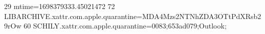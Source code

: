 29 mtime=1698379333.45021472
72 LIBARCHIVE.xattr.com.apple.quarantine=MDA4Mzs2NTNhZDA3OTtPdXRsb29rOw
60 SCHILY.xattr.com.apple.quarantine=0083;653ad079;Outlook;
